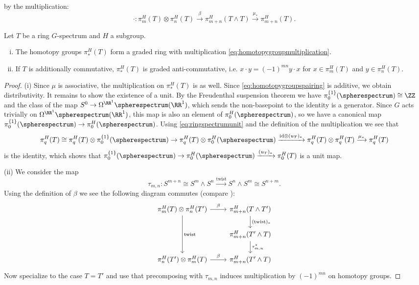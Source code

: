 by the multiplication:
\begin{equation}\label{eq:homotopygroupmultiplication}
\cdot:\pi_m^H(T)\otimes \pi_n^H(T)\xrightarrow{\beta}\pi_{m+n}^H(T\wedge T)
\xrightarrow{\mu_\ast} \pi_{m+n}^H(T).
\end{equation}
\begin{prop}
Let $T$ be a ring $G$-spectrum and $H$ a subgroup.
\begin{enumerate}[(i)]
\item The homotopy groups $\pi_\ast^H(T)$
form a graded ring with multiplication \eqref{eq:homotopygroupmultiplication}.
\item If $T$ is additionally commutative, $\pi_\ast^H(T)$ is graded anti-commutative,
i.e. $x\cdot y = (-1)^{mn}y\cdot x$ for $x\in \pi_m^H(T)$ and $y\in \pi_n^H(T)$.
\end{enumerate}
\end{prop}

\begin{proof}
(i) Since $\mu$ is associative, the multiplication on $\pi_\ast^H(T)$ is as well. Since \eqref{eq:homotopygroupspairing}
is additive, we obtain distributivity. It remains to show the existence of a unit. By the Freudenthal suspension
theorem we have $\pi_0^{\{1\}}(\spherespectrum)\cong \ZZ$ and the class of the map
$S^0\to \Omega^{\RR^1}\spherespectrum(\RR^1)$, which sends the non-basepoint to the
identity is a generator. Since $G$ acts trivially on $\Omega^{\RR^1}\spherespectrum(\RR^1)$,
this map is also an element of $\pi_0^H(\spherespectrum)$, so we have a canonical map
$\pi_0^{\{1\}}(\spherespectrum)\to \pi_0^H(\spherespectrum)$. 
Using \eqref{eq:ringspectrumunit} and the definition of the multiplication
we see that
\[
\pi_q^H(T)\cong \pi_q^H(T)\otimes \pi_0^{\{1\}}(\spherespectrum)
\to  \pi_q^H(T)\otimes \pi_0^H(\spherespectrum)
\xrightarrow{\mathrm{id}\otimes (u_T)_\ast} 
\pi_q^H(T)\otimes \pi_q^H(T) \xrightarrow{\mu_\ast}
\pi_q^H(T)
\]
is the identity, which shows that $\pi_0^{\{1\}}(\spherespectrum)\to \pi_0^H(\spherespectrum)
\xrightarrow{(u_T)_\ast} \pi_0^H(T)$ is a unit map. 

(ii) We consider the map
\[
\tau_{m,n}: S^{m+n}\cong S^m\wedge S^n\xrightarrow{\mathrm{twist}}
S^n\wedge S^m\cong S^{n+m}.
\]
Using the definition of $\beta$ we see the following diagram commutes
(compare \cite[Proposition~4.29, \pno~39]{schwedeequivariant}):
\[
\begin{tikzcd}
\pi_m^H(T)\otimes \pi_n^H(T')
\arrow{dd}{\mathrm{twist}}
\arrow{r}{\beta}
&\pi_{m+n}^H(T\wedge T')
\arrow{d}{(\mathrm{twist})_\ast}\\
&\pi_{m+n}^H(T'\wedge T)
\arrow{d}{\tau_{m,n}^\ast}\\
\pi_n^H(T')\otimes \pi_m^H(T)
\arrow{r}{\beta}
&\pi_{m+n}^H(T'\wedge T)
\end{tikzcd}
\]
Now specialize to the case $T = T'$ and use that
precomposing with $\tau_{m,n}$ induces multiplication
by $(-1)^{mn}$ on homotopy groups.
\end{proof}


